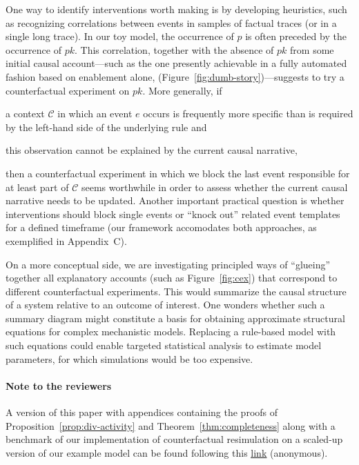 One way to identify interventions worth making is by developing
heuristics, such as recognizing correlations between events in samples
of factual traces (or in a single long trace). In our toy model, the
occurrence of $p$ is often preceded by the occurrence of $pk$. This
correlation, together with the absence of $pk$ from some initial
causal account---such as the one presently achievable in a fully
automated fashion based on enablement alone,
(Figure~\ref{fig:dumb-story})---suggests to try a counterfactual
experiment on $pk$. More generally, if \begin{inparaenum}[(i)] \item a
  context $\mathcal C$ in which an event $e$ occurs is frequently more
  specific than is required by the left-hand side of the underlying
  rule and \item this observation cannot be explained by the current
  causal narrative, \end{inparaenum} then a counterfactual experiment
in which we block the last event responsible for at least part of
$\mathcal C$ seems worthwhile in order to assess whether the current
causal narrative needs to be updated.  Another important practical
question is whether interventions should block single events or
``knock out'' related event templates for a defined timeframe (our
framework accomodates both approaches, as exemplified in Appendix~C).

On a more conceptual side, we are investigating principled ways of ``glueing''
together all explanatory accounts (such as Figure~\ref{fig:cex}) that correspond
to different counterfactual experiments. This would summarize the causal
structure of a system relative to an outcome of interest. One wonders whether
such a summary diagram might constitute a basis for obtaining approximate
structural equations for complex mechanistic models. Replacing a rule-based
model with such equations could enable targeted statistical analysis to estimate
model parameters, for which simulations would be too expensive.

\ifreview
\ifincludeappendices
\else
\paragraph{Note to the reviewers}
A version of this paper with appendices containing the proofs of
Proposition~\ref{prop:div-activity} and Theorem~\ref{thm:completeness}
along with a benchmark of our implementation of counterfactual
resimulation on a scaled-up version of our example model can be found
following this
\underline{\href{https://www.dropbox.com/sh/2fwji0its0o0ciq/AABfLZ-GO2wCE2x3h3ulUbB-a?dl=0}{link}}
(anonymous).
\fi
\fi
